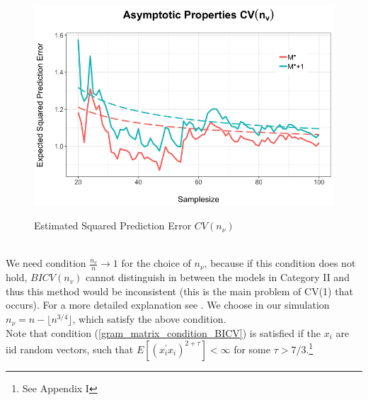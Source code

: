 \documentclass[Research_Module_ES.tex]{subfiles}
\begin{document}
\begin{figure}[!h]
	\label{ProofSektchCVn_v}
	\centering
	\includegraphics[width=1\textwidth]{ProofSketchNV.png}\\
	\caption{Estimated Squared Prediction Error $CV(n_\nu)$}
\end{figure}
\\
We need condition $\frac{n_v}{n}\to 1$ for the choice of $n_\nu$, because if this condition does not hold, $BICV(n_v)$ cannot distinguish in between the models in Category II and thus this method would be inconsistent (this is the main problem of CV(1) that occurs). For a more detailed explanation see \cite{shao}. We choose in our simulation $n_\nu=n-\lfloor n^{3/4}\rfloor$, which satisfy the above condition.\\

Note that condition (\ref{gram_matrix_condition_BICV}) is satisfied if the $x_i$ are iid random vectors, such that $E[(x_i^\prime x_i)^{2+\tau}]<\infty$ for some $\tau>7/3$.\footnote{See Appendix I}
\end{document}
